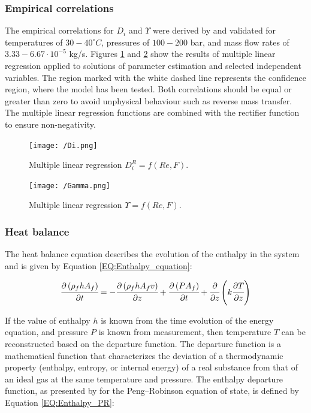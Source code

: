 \documentclass[a4paper,fleqn]{cas-dc}
\begin{document}
	\subsubsection{Empirical correlations}
	
	The empirical correlations for $D_i$ and $\Upsilon$ were derived by \citet{Sliczniuk2024} and validated for temperatures of $30 - 40^\circ C$, pressures of $100 - 200$ bar, and mass flow rates of $3.33-6.67 \cdot 10^{-5}$ kg/s. Figures \ref{fig:Correlation_Di} and \ref{fig:Correlation_Gamma} show the results of multiple linear regression applied to solutions of parameter estimation and selected independent variables. The region marked with the white dashed line represents the confidence region, where the model has been tested. Both correlations should be equal or greater than zero to avoid unphysical behaviour such as  reverse mass transfer. The multiple linear regression functions are combined with the rectifier function to ensure non-negativity.
	
	\begin{figure}[!ht]
		\centering
		\texttt{[image: /Di.png]}
		\caption{Multiple linear regression $D_i^R = f(Re, F).$}
		\label{fig:Correlation_Di}
	\end{figure}
	
	\begin{figure}[!ht]
		\centering
		\texttt{[image: /Gamma.png]}
		\caption{Multiple linear regression $\Upsilon = f(Re, F).$}
		\label{fig:Correlation_Gamma}
	\end{figure}
	
	\subsubsection{Heat balance} \label{CH: heat_balance}
	
	The heat balance equation describes the evolution of the enthalpy in the system and is given by Equation \ref{EQ:Enthalpy_equation}:
	
	{\footnotesize
		\begin{equation} \label{EQ:Enthalpy_equation}
			\cfrac{\partial \left(\rho_f h A_f\right)}{\partial t} = - \cfrac{\partial \left( \rho_f h A_f v \right)}{\partial z} + \cfrac{\partial \left(P A_f\right)}{\partial t} + \cfrac{\partial}{\partial z} \left( k \cfrac{\partial T}{\partial z} \right)
		\end{equation}
	}
	
	If the value of enthalpy $h$ is known from the time evolution of the energy equation, and pressure $P$ is known from measurement, then temperature $T$ can be reconstructed based on the departure function. The departure function is a mathematical function that characterizes the deviation of a thermodynamic property (enthalpy, entropy, or internal energy) of a real substance from that of an ideal gas at the same temperature and pressure. The enthalpy departure function, as presented by \citet{Gmehling2019} for the Peng--Robinson equation of state,  is defined by Equation \ref{EQ:Enthalpy_PR}:
	
\end{document}
